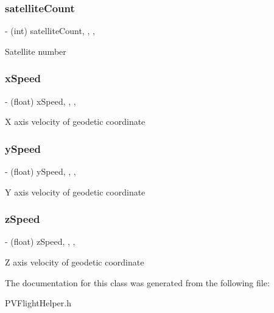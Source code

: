 \subsubsection{\texorpdfstring{satellite\+Count}{satelliteCount}}
{\footnotesize\ttfamily -\/ (int) satellite\+Count\hspace{0.3cm}{\ttfamily [read]}, {\ttfamily [write]}, {\ttfamily [nonatomic]}, {\ttfamily [assign]}}

Satellite number \mbox{\label{interface_p_v_flight_helper_aa49f0ab35f579d8ce9053cc90506dd35}} 
\subsubsection{\texorpdfstring{x\+Speed}{xSpeed}}
{\footnotesize\ttfamily -\/ (float) x\+Speed\hspace{0.3cm}{\ttfamily [read]}, {\ttfamily [write]}, {\ttfamily [nonatomic]}, {\ttfamily [assign]}}

X axis velocity of geodetic coordinate \mbox{\label{interface_p_v_flight_helper_ad3cecb3402abf018180f51ae9d9c2d1a}} 
\subsubsection{\texorpdfstring{y\+Speed}{ySpeed}}
{\footnotesize\ttfamily -\/ (float) y\+Speed\hspace{0.3cm}{\ttfamily [read]}, {\ttfamily [write]}, {\ttfamily [nonatomic]}, {\ttfamily [assign]}}

Y axis velocity of geodetic coordinate \mbox{\label{interface_p_v_flight_helper_af6e757bedc779483fcdbef944fb866e7}} 
\subsubsection{\texorpdfstring{z\+Speed}{zSpeed}}
{\footnotesize\ttfamily -\/ (float) z\+Speed\hspace{0.3cm}{\ttfamily [read]}, {\ttfamily [write]}, {\ttfamily [nonatomic]}, {\ttfamily [assign]}}

Z axis velocity of geodetic coordinate 

The documentation for this class was generated from the following file\+:\begin{DoxyCompactItemize}
\item 
P\+V\+Flight\+Helper.\+h\end{DoxyCompactItemize}
